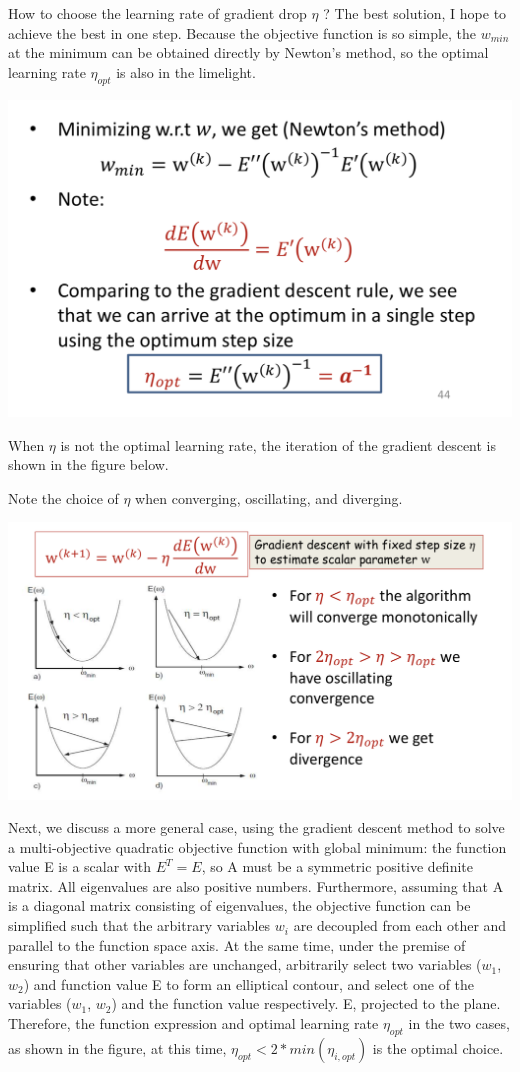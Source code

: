 \documentclass{article}
\begin{document}
	How to choose the learning rate of gradient drop $\eta$ ? The best solution, I hope to achieve the best in one step. Because the objective function is so simple, the $w_{min}$ at the minimum can be obtained directly by Newton's method, so the optimal learning rate $\eta_{opt}$ is also in the limelight.
	
	\includegraphics[scale=0.2]{71.png}
	
	When $\eta$ is not the optimal learning rate, the iteration of the gradient descent is shown in the figure below. 
	
	Note the choice of $\eta$ when converging, oscillating, and diverging.
	
	\includegraphics[scale=0.2]{72.png}
	
	Next, we discuss a more general case, using the gradient descent method to solve a multi-objective quadratic objective function with global minimum: the function value E is a scalar with $E^T=E$, so A must be a symmetric positive definite matrix. All eigenvalues are also positive numbers. Furthermore, assuming that A is a diagonal matrix consisting of eigenvalues, the objective function can be simplified such that the arbitrary variables $w_i$ are decoupled from each other and parallel to the function space axis. At the same time, under the premise of ensuring that other variables are unchanged, arbitrarily select two variables ($w_1$, $w_2$) and function value E to form an elliptical contour, and select one of the variables ($w_1$, $w_2$) and the function value respectively. E, projected to the plane. Therefore, the function expression and optimal learning rate $\eta_{opt}$ in the two cases, as shown in the figure, at this time, $\eta_{opt}<2*min(\eta_{i,opt})$ is the optimal choice.
	
\end{document}
